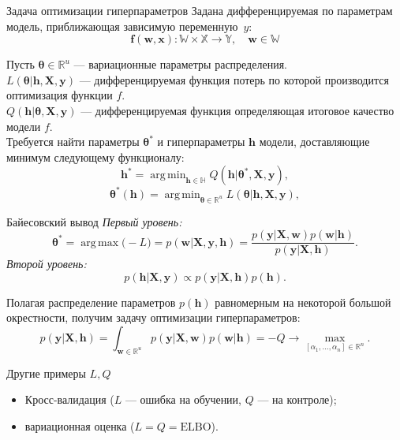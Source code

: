 \documentclass[usenames,dvipsnames,10pt,pdf,utf8,russian,aspectratio=43]{beamer}
\DeclareMathOperator*{\argmax}{arg\,max}
\DeclareMathOperator*{\argmin}{arg\,min}
\begin{document}
\begin{frame}{Задача оптимизации гиперпараметров}
Задана дифференцируемая по параметрам модель, приближающая зависимую переменную~$y$:
\[
	\mathbf{f}(\mathbf{w}, \mathbf{x}):\mathbb{W} \times \mathbb{X} \to \mathbb{Y}, \quad \mathbf{w} \in \mathbb{W}
\]

Пусть $\boldsymbol{\theta} \in \mathbb{R}^u$ --- вариационные параметры распределения.\\
$L( \boldsymbol{\theta}| \mathbf{h}, \mathbf{X}, \mathbf{y})$ ---  дифференцируемая функция потерь  по которой производится оптимизация функции ${f}$. \\
$Q(\mathbf{h}| \boldsymbol{\theta}, \mathbf{X}, \mathbf{y} )$ ---  дифференцируемая функция определяющая итоговое качество модели ${f}$.\\

Требуется найти параметры $\boldsymbol{\theta}^{*}$ и гиперпараметры $\mathbf{h}$ модели, доставляющие минимум следующему функционалу:
$$
    \mathbf{h}^{*} = \argmin_{\mathbf{h} \in \mathbb{H}} Q(\mathbf{h}|  \boldsymbol{\theta}^{*}, \mathbf{X}, \mathbf{y} ),
$$
$$
	\boldsymbol{\theta}^{*}(\mathbf{h}) =  \argmin_{\boldsymbol{\theta} \in \mathbb{R}^u} L(\boldsymbol{\theta}|  \mathbf{h},  \mathbf{X}, \mathbf{y}),
$$
\end{frame}


\begin{frame}{Байесовский вывод}
\textit{Первый уровень:}
\[
{\boldsymbol{\theta}}^{*} = \argmax \bigl(-L\bigr) = p(\mathbf{w}|\mathbf{X}, \mathbf{y}, \mathbf{h}) = \frac{p(\mathbf{y}|\mathbf{X},\mathbf{w})p(\mathbf{w}|\mathbf{h})}{p(\mathbf{y}|\mathbf{X},\mathbf{h})}.
\]
\textit{Второй уровень:}
\[
p(\mathbf{h}|\mathbf{X}, \mathbf{y}) \propto p(\mathbf{y}|\mathbf{X},\mathbf{h})p(\mathbf{h}).
\]

Полагая распределение параметров $p(\mathbf{h})$ равномерным на некоторой большой окрестности, получим задачу оптимизации гиперпараметров:
\begin{equation}
\label{eq:bayes2}
	p(\mathbf{y}|\mathbf{X},\mathbf{h}) = \int_{\mathbf{w} \in \mathbb{R}^u} p(\mathbf{y}|\mathbf{X}, \mathbf{w}) p(\mathbf{w}|\mathbf{h}) = -Q \to \max_{[\alpha_1, \dots, \alpha_n] \in \mathbb{R}^{n}}.
\end{equation}
\end{frame}

\begin{frame}{Другие примеры $L,Q$}

\begin{itemize}
\item Кросс-валидация ($L$ --- ошибка на обучении, $Q$ --- на контроле);
\item вариационная оценка ($L=Q=\text{ELBO}$).
\end{itemize}
\end{frame}
\end{document}
